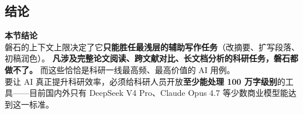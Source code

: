 \subsection{结论}

\begin{keypoint}
\sffamily\textbf{本节结论}\\[3pt]
\normalfont
磐石的上下文上限决定了它\textbf{只能胜任最浅层的辅助写作任务}（改摘要、扩写段落、初稿润色）。
\textbf{凡涉及完整论文阅读、跨文献对比、长文档分析的科研任务，磐石都做不了。}
而这些恰恰是科研一线最高频、最高价值的 AI 用例。\\[3pt]
要让 AI 真正提升科研效率，必须给科研人员开放\textbf{至少能处理 100 万字级别}的工具——目前国内外只有 DeepSeek V4 Pro、Claude Opus 4.7 等少数商业模型能达到这一标准。
\end{keypoint}
